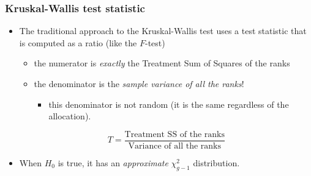 \documentclass[a4paper]{article}
\begin{document}
\subsubsection{Kruskal-Wallis test statistic}
\begin{itemize}
	\item The traditional approach to the Kruskal-Wallis test uses a test statistic that is computed as a ratio (like the \( F \)-test)
	\begin{itemize}
		\item the numerator is \textit{exactly} the Treatment Sum of Squares of the ranks
		\item the denominator is the \textit{sample variance of all the ranks}!
		\begin{itemize}
			\item this denominator is not random (it is the same regardless of the allocation).
		\end{itemize}
	\end{itemize}
	\[
		T = \frac{\text{Treatment SS of the ranks}}{\text{Variance of all the ranks}}
	\]
	\item When \( H_0 \) is true, it has an \textit{approximate} \( \chi^{2}_{g-1} \) distribution. 
\end{itemize}
\end{document}
